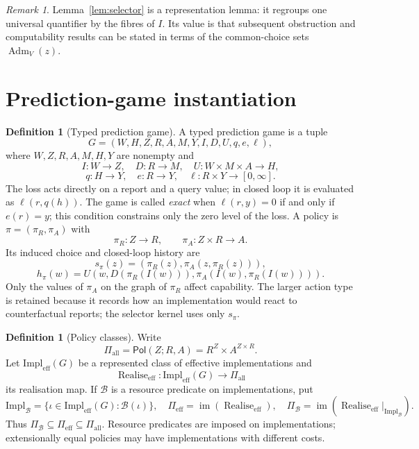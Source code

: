 \documentclass[11pt]{article}
\theoremstyle{plain}
\theoremstyle{definition}
\newtheorem{definition}[theorem]{Definition}
\theoremstyle{remark}
\newtheorem{remark}[theorem]{Remark}
\newcommand{\im}{\operatorname{im}}
\newcommand{\Adm}{\operatorname{Adm}}
\newcommand{\Pol}{\mathsf{Pol}}
\newcommand{\realise}{\operatorname{Realise}}
\begin{document}
\begin{remark}
Lemma~\ref{lem:selector} is a representation lemma: it regroups one universal
quantifier by the fibres of $I$. Its value is that subsequent obstruction and
computability results can be stated in terms of the common-choice sets
$\Adm_V(z)$.
\end{remark}

\section{Prediction-game instantiation}\label{sec:games}

\begin{definition}[Typed prediction game]\label{def:game}
A typed prediction game is a tuple
\[
G=(W,H,Z,R,A,M,Y,I,D,U,q,e,\ell),
\]
where $W,Z,R,A,M,H,Y$ are nonempty and
\[
I:W\to Z,\quad D:R\to M,\quad U:W\times M\times A\to H,
\]
\[
q:H\to Y,\quad e:R\to Y,\quad \ell:R\times Y\to[0,\infty].
\]
The loss acts directly on a report and a query value; in closed loop it is
evaluated as $\ell(r,q(h))$. The game is called \emph{exact} when
$\ell(r,y)=0$ if and only if $e(r)=y$; this condition constrains only the zero
level of the loss. A policy is
$\pi=(\pi_R,\pi_A)$ with
\[
\pi_R:Z\to R,\qquad \pi_A:Z\times R\to A.
\]
Its induced choice and closed-loop history are
\[
s_\pi(z)=(\pi_R(z),\pi_A(z,\pi_R(z))),
\]
\[
h_\pi(w)=U(w,D(\pi_R(I(w))),\pi_A(I(w),\pi_R(I(w)))).
\]
Only the values of $\pi_A$ on the graph of $\pi_R$ affect capability. The larger
action type is retained because it records how an implementation would react to
counterfactual reports; the selector kernel uses only $s_\pi$.
\end{definition}

\begin{definition}[Policy classes]\label{def:realise}
Write
\[
\Pi_{\mathrm{all}}=\Pol(Z;R,A)=R^Z\times A^{Z\times R}.
\]
Let $\mathrm{Impl}_{\mathrm{eff}}(G)$ be a represented class of effective
implementations and
\[
\realise_{\mathrm{eff}}:\mathrm{Impl}_{\mathrm{eff}}(G)
\to\Pi_{\mathrm{all}}
\]
its realisation map. If $\mathcal B$ is a resource predicate on implementations,
put
\[
\mathrm{Impl}_{\mathcal B}
=\{\iota\in\mathrm{Impl}_{\mathrm{eff}}(G):\mathcal B(\iota)\},\quad
\Pi_{\mathrm{eff}}=\im(\realise_{\mathrm{eff}}),\quad
\Pi_{\mathcal B}=\im(\realise_{\mathrm{eff}}|_{\mathrm{Impl}_{\mathcal B}}).
\]
Thus $\Pi_{\mathcal B}\subseteq\Pi_{\mathrm{eff}}\subseteq\Pi_{\mathrm{all}}$.
Resource predicates are imposed on implementations; extensionally equal policies
may have implementations with different costs.
\end{definition}
\end{document}

